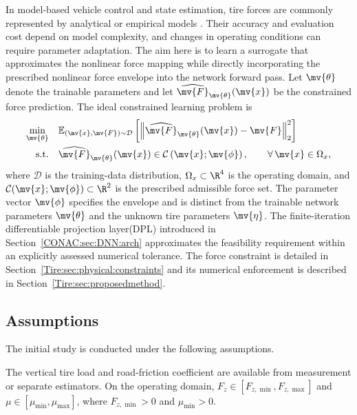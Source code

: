 In model-based vehicle control and state estimation, tire forces are commonly
represented by analytical or empirical models . Their
accuracy and evaluation cost depend on model complexity, and changes in
operating conditions can require parameter adaptation. The aim here is to learn
a surrogate that approximates the nonlinear force mapping while directly
incorporating the prescribed nonlinear force envelope into the network forward
pass. Let $\mv{\theta}$ denote the trainable parameters and let
$\widehat{\mv{F}}_{\mv{\theta}}(\mv{x})$ be the constrained force prediction.
The ideal constrained learning problem is
\begin{equation}
	\label{Tire:eq:objective}
	\begin{aligned}
		\min_{\mv{\theta}}
		\quad &
		\mathbb{E}_{(\mv{x},\mv{F})\sim\mathcal{D}}
		\left[
			\left\|
			\widehat{\mv{F}}_{\mv{\theta}}(\mv{x})
			-
			\mv{F}
			\right\|_2^2
			\right]
		\\
		\text{s.t.}
		\quad &
		\widehat{\mv{F}}_{\mv{\theta}}(\mv{x})
		\in
		\mathcal{C}
		\left(
		\mv{x};\mv{\phi}
		\right)
		,
		\qquad
		\forall\,\mv{x}\in\Omega_x
		,
	\end{aligned}
\end{equation}
where $\mathcal{D}$ is the training-data distribution,
$\Omega_x\subset\R^4$ is the operating domain, and
$\mathcal{C}(\mv{x};\mv{\phi})\subset\R^2$ is the prescribed
admissible force set. The parameter vector $\mv{\phi}$ specifies the
envelope and is distinct from the trainable network parameters
$\mv{\theta}$ and the unknown tire parameters $\mv{\eta}$.
The finite-iteration differentiable projection layer(DPL) introduced in
Section~\ref{CONAC:sec:DNN:arch} approximates the feasibility requirement within an explicitly assessed numerical tolerance. The force constraint is detailed in Section~\ref{Tire:sec:physical:constraints} and its numerical enforcement is described in Section~\ref{Tire:sec:proposedmethod}.

\subsection{Assumptions}
\label{Tire:sec:assumptions}
The initial study is conducted under the following assumptions.

\begin{assum}
	\label{Tire:assum:context}
	The vertical tire load and road-friction coefficient are available
	from measurement or separate estimators. On the operating domain,
	$F_z\in[F_{z,\min},F_{z,\max}]$ and
	$\mu\in[\mu_{\min},\mu_{\max}]$, where
	$F_{z,\min}>0$ and $\mu_{\min}>0$.
\end{assum}

